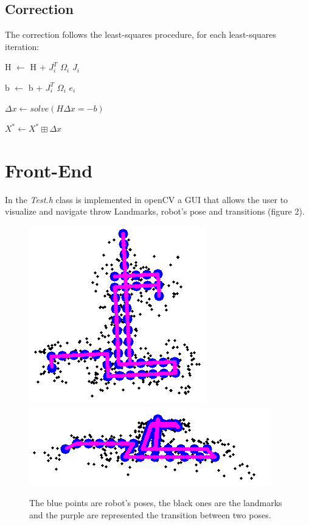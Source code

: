 \documentclass[10pt]{article}
\begin{document}
	\subsection{Correction}
	The correction follows the least-squares procedure, for each least-squares iteration:
	\begin{center}
		H $\leftarrow$ H + $J_{\textit{i}}^{T}$ $\Omega_{\textit{i}}$ $J_{\textit{i}}$		
	
		b $\leftarrow$ b + $J_{\textit{i}}^{T}$ $\Omega_{\textit{i}}$ $e_{\textit{i}}$ 
	
		$\Delta x \leftarrow solve(H\Delta x=-b)$
	
		$X^* \leftarrow X^* \boxplus \Delta x$
	\end{center}
	
	\section{Front-End}
	In the \textit{Test.h} class is implemented in openCV a GUI that allows the user to visualize and navigate throw Landmarks, robot's pose and transitions (figure 2). 
	
	\begin{figure}[H]
		\centering
		\includegraphics[width=0.5\linewidth]{img/exact}
		\includegraphics[width=0.8\linewidth]{img/exact2}
		\caption{The blue points are robot's poses, the black ones are the landmarks and the purple are represented the transition between two poses.}
		\label{fig:exact}
	\end{figure}
	
\end{document}
